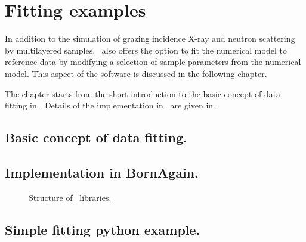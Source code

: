 \chapter{Fitting examples} 

In addition to the simulation of grazing incidence
X-ray and neutron scattering by
multilayered samples, \BornAgain\ also offers the option to
fit the numerical model to reference data by modifying a selection of
sample parameters from the numerical model.  This aspect
of the software is discussed in the following chapter.

The chapter starts from the short introduction to the basic concept of data fitting
in . Details of the implementation in \BornAgain\ are given
in . 


\section{Basic concept of data fitting.} 


\section{Implementation in BornAgain.} 

\begin{figure}[htbp]
\centering
\caption{
Structure of \BornAgain\ libraries.
}
\label{fig:two_ratios}
\end{figure}



\section{Simple fitting python example.} 



